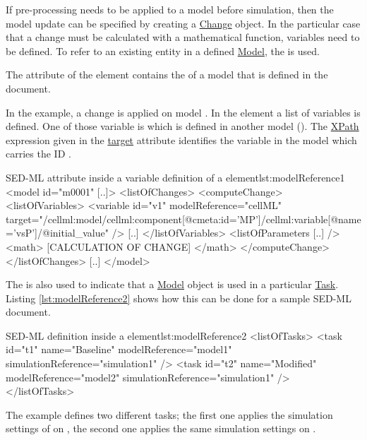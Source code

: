If pre-processing needs to be applied to a model before simulation, then the model update can be specified by creating a \hyperref[class:change]{Change} object. In the particular case that a change must be calculated with a mathematical function, variables need to be defined. To refer to an existing entity in a defined \hyperref[class:model]{Model}, the  is used. 

The  attribute of the  element contains the  of a model that is defined in the document. 

In the example, a change is  applied on model . In the  element a list of variables is defined. One of those variable is  which is defined in another model (). The \hyperref[sec:xpath]{XPath} expression given in the \hyperref[sec:target]{target} attribute identifies the variable in the model which carries the ID .
\begin{myXmlLst}{SED-ML  attribute inside a variable definition of a  element}{lst:modelReference1}
<model id="m0001" [..]>
	<listOfChanges>
		<computeChange>
			<listOfVariables>
				<variable id="v1" modelReference="cellML" target="/cellml:model/cellml:component[@cmeta:id='MP']/cellml:variable[@name='vsP']/@initial_value" />
     			[..]
			</listOfVariables>
			<listOfParameters [..] />
    			<math>
     			[CALCULATION OF CHANGE]
    			</math>
   		</computeChange>
	</listOfChanges>
	[..]
</model>
\end{myXmlLst}

The  is also used to indicate that a \hyperref[class:model]{Model} object is used in a particular  \hyperref[class:task]{Task}. Listing \ref{lst:modelReference2} shows how this can be done for a sample SED-ML document.

\begin{myXmlLst}{SED-ML  definition inside a  element}{lst:modelReference2}
<listOfTasks>
	<task id="t1" name="Baseline" modelReference="model1" simulationReference="simulation1" />
	<task id="t2" name="Modified" modelReference="model2" simulationReference="simulation1" />
</listOfTasks>
\end{myXmlLst}

The example defines two different tasks; the first one applies the simulation settings of  on , the second one applies the same simulation settings on .



